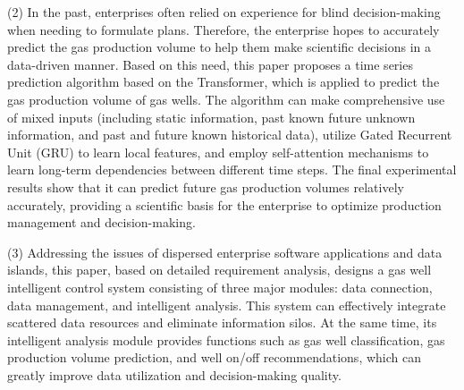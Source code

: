 \begin{englishabstract}
    (2) In the past, enterprises often relied on experience for blind decision-making when needing to formulate plans. Therefore, the enterprise hopes to accurately predict the gas production volume to help them make scientific decisions in a data-driven manner. Based on this need, this paper proposes a time series prediction algorithm based on the Transformer, which is applied to predict the gas production volume of gas wells. The algorithm can make comprehensive use of mixed inputs (including static information, past known future unknown information, and past and future known historical data), utilize Gated Recurrent Unit (GRU) to learn local features, and employ self-attention mechanisms to learn long-term dependencies between different time steps. The final experimental results show that it can predict future gas production volumes relatively accurately, providing a scientific basis for the enterprise to optimize production management and decision-making.
    
    (3) Addressing the issues of dispersed enterprise software applications and data islands, this paper, based on detailed requirement analysis, designs a gas well intelligent control system consisting of three major modules: data connection, data management, and intelligent analysis. This system can effectively integrate scattered data resources and eliminate information silos. At the same time, its intelligent analysis module provides functions such as gas well classification, gas production volume prediction, and well on/off recommendations, which can greatly improve data utilization and decision-making quality.
\end{englishabstract}
\XDUpremainmatter
